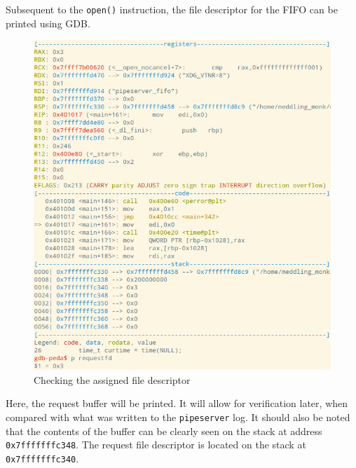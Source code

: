 \documentclass[letter,12pt,sffamily]{article}
\begin{document}
Subsequent to the \texttt{open()} instruction, the file descriptor for the FIFO can be printed using GDB.
\begin{figure}[H]
	\centering
	\includegraphics[width=1\linewidth]{./images/18}
	\caption[assigned_file_descriptor]{Checking the assigned file descriptor}
	\label{fig:19}
\end{figure}
Here, the request buffer will be printed. It will allow for verification later, when compared with what was written to the \texttt{pipeserver} log.
It should also be noted that the contents of the buffer can be clearly seen on the stack at address \texttt{0x7fffffffc348}. The request file descriptor
is located on the stack at \texttt{0x7fffffffc340}.
\end{document}
